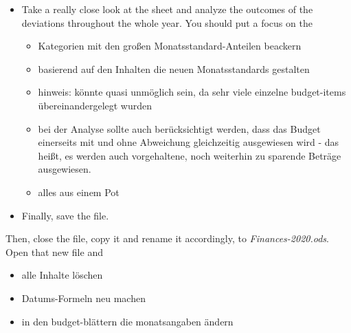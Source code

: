 \begin{itemize}
	\item Take a really close look at the  sheet and analyze the outcomes of the deviations throughout the whole year.
	You should put a focus on the 
	\begin{itemize}
		\item Kategorien mit den großen Monatsstandard-Anteilen beackern
		\item basierend auf den Inhalten die neuen Monatsstandards gestalten
		\item hinweis: könnte quasi unmöglich sein, da sehr viele einzelne budget-items übereinandergelegt wurden
		\item bei der Analyse sollte auch berücksichtigt werden, dass das Budget einerseits mit und ohne Abweichung gleichzeitig ausgewiesen wird - das heißt, es werden auch vorgehaltene, noch weiterhin zu sparende Beträge ausgewiesen.
		\item alles aus einem Pot
	\end{itemize}	
	\item Finally, save the file.	
\end{itemize}

Then, close the file, copy it and rename it accordingly, \eg to \emph{Finances-2020.ods}.
Open that new file and
\begin{itemize}
	\item alle Inhalte löschen
	\item Datums-Formeln neu machen
	\item in den budget-blättern die monatsangaben ändern
\end{itemize}